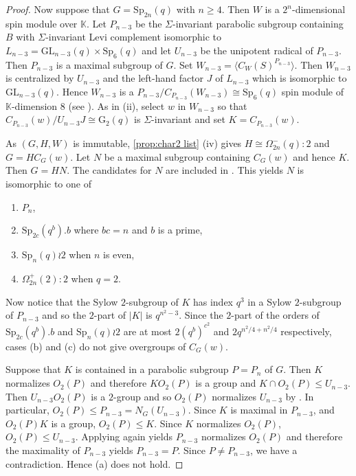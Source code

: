 \documentclass[12pt]{amsart}
\theoremstyle{remark}
\theoremstyle{notation}
\theoremstyle{definition}
\newcommand{\G}{\mathrm{G}}
\newcommand{\GL}{\mathrm{GL}}
\newcommand{\Sp}{\mathrm{Sp}}
\newcommand{\0}{\emptyset}
\begin{document}
\begin{proof}
Now suppose that $G = \Sp_{2n}(q)$ with $n \ge 4$. Then $W$ is   a $2^n$-dimensional spin module over $\mathbb K$.  Let $P_{n-3}$ be the $\Sigma$-invariant parabolic subgroup  containing $B$ with $\Sigma$-invariant Levi complement isomorphic to $L_{n-3}=\GL_{n-3}(q) \times \Sp_6(q)$ and let $ U_{n-3}$ be the unipotent radical of $P_{n-3}$.  Then $P_{n-3}$ is a maximal subgroup of $G$.   Set $W_{n-3}= \langle C_W(S)^{P_{n-3}}\rangle$.  Then $W_{n-3}$ is centralized by $U_{n-3}$ and the left-hand factor $J$ of $L_{n-3}$ which is isomorphic to $\GL_{n-3}(q)$. Hence $W_{n-3}$ is a $P_{n-3}/C_{P_{n-3}}(W_{n-3})\cong \Sp_6(q)$ spin module of $\mathbb K$-dimension $8$ (see \cite[Theorem 6.1]{PR03}). As in (ii), select $w$ in $W_{n-3}$ so that $C_{P_{n-3}}(w)/U_{n-3}J \cong \G_2(q)$ is $\Sigma$-invariant and set $K = C_{P_{n-3}}(w)$.

As $(G,H,W)$ is immutable,  \cref{prop:char2 list} (iv) gives $H \cong \Omega_{2n}^-(q){:}2$ and $G= HC_G(w)$. Let $N$ be a maximal subgroup containing $C_G(w)$ and hence $K$.  Then $G= HN$.  The candidates for $N$ are included in \cite[Theorem A, Tables 1 \& 2  ]{LiebeckPraegerSaxl}. This yields $N$ is isomorphic to one of

\begin{enumerate}
\item [(a)]$P_n$,
\item [(b)]$\Sp_{2c}(q^b).b$ where $bc=n$ and $b$ is a prime,
\item [(c)]$\Sp_n(q)\wr 2$ when $n$ is even,
\item [(d)]$\Omega_{2n}^+(2):2$ when $q=2$.
\end{enumerate}

Now notice that the Sylow $2$-subgroup of $K$ has index $q^3$ in a Sylow $2$-subgroup of $P_{n-3}$ and so the $2$-part of $|K|$ is $q^{n^2-3}$. Since the $2$-part of the orders of $\Sp_{2c}(q^b).b$ and  $\Sp_n(q)\wr 2$ are at most $2(q^b)^{c^2}$ and $2q^{n^2/4+ n^2/4}$ respectively, cases (b) and (c) do not give overgroups of $C_G(w)$.




Suppose that $K$ is contained in a parabolic subgroup $P=P_n$ of $G$. Then $K$ normalizes $O_2(P)$ and therefore $KO_2(P)$ is a group and $K \cap O_2(P)\le  U_{n-3}$. Then $U_{n-3}O_2(P)$ is a $2$-group and so $O_2(P)$ normalizes   $U_{n-3}$ by \cite[Lemma 4.2]{Grodal}. In particular, $O_2(P)\le P_{n-3}=N_G(U_{n-3})$.  Since $K$ is maximal in $P_{n-3}$, and $O_2(P)K$ is a group, $O_2(P) \le K$. Since $K$ normalizes $O_2(P)$, $O_2(P)\le U_{n-3}$.  Applying  \cite[Lemma 4.2]{Grodal} again yields $P_{n-3}$ normalizes $O_2(P)$ and therefore the maximality of $P_{n-3}$ yields $P_{n-3}= P$.  Since $P  \ne P_{n-3}$, we have a contradiction. Hence (a) does not hold.



\end{proof}
\end{document}
